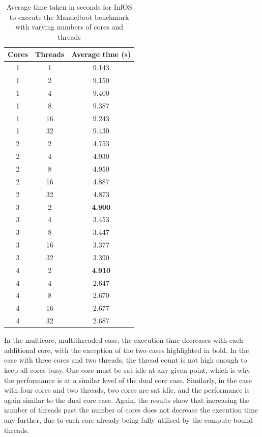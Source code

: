 \documentclass[bsc,frontabs,singlespacing,parskip,deptreport]{infthesis}     %
\begin{document}
\begin{table}[h]\centering
\normalsize
\begin{tabular}{ccc}\toprule
Cores & Threads & Average time (s) \\
\midrule
1 &1 &9.143 \\
\midrule
1 &2 &9.150 \\
1 &4 &9.400 \\
1 &8 &9.387 \\
1 &16 &9.243 \\
1 &32 &9.430 \\
\midrule
2 &2 &4.753 \\
2 &4 &4.930 \\
2 &8 &4.950 \\
2 &16 &4.887 \\
2 &32 &4.873 \\
\midrule
3 &2 &\textbf{4.900} \\
3 &4 &3.453 \\
3 &8 &3.447 \\
3 &16 &3.377 \\
3 &32 &3.390 \\
\midrule
4 &2 &\textbf{4.910} \\
4 &4 &2.647 \\
4 &8 &2.670 \\
4 &16 &2.677 \\
4 &32 &2.687 \\
\bottomrule
\end{tabular}
\caption{Average time taken in seconds for InfOS to execute the Mandelbrot benchmark with varying numbers of cores and threads}\label{timing-infos-mb}
\end{table}

In the multicore, multithreaded case, the execution time decreases with each additional core, with the exception of the two cases highlighted in bold. In the case with three cores and two threads, the thread count is not high enough to keep all cores busy. One core must be sat idle at any given point, which is why the performance is at a similar level of the dual core case. Similarly, in the case with four cores and two threads, two cores are sat idle, and the performance is again similar to the dual core case. Again, the results show that increasing the number of threads past the number of cores does not decrease the execution time any further, due to each core already being fully utilised by the compute-bound threads.
\end{document}
